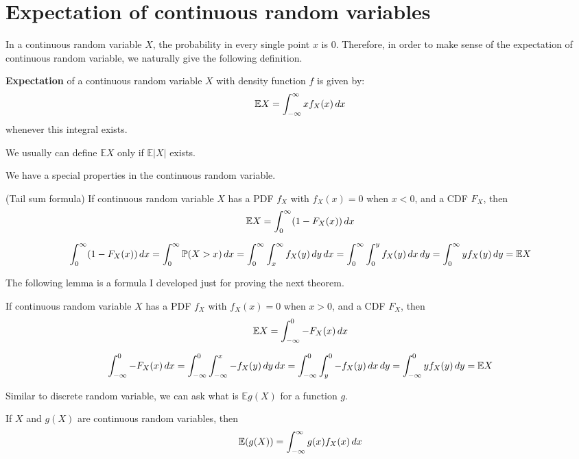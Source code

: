 \documentclass{huhtakm-template-book}
\newcommand{\prob}{\mathbb{P}}
\newcommand{\expect}{\mathbb{E}}
\begin{document}
\section{Expectation of continuous random variables}
In a continuous random variable $X$, the probability in every single point $x$ is $0$. Therefore, in order to make sense of the expectation of continuous random variable, we naturally give the following definition.
\begin{defn}
	\textbf{Expectation} of a continuous random variable $X$ with density function $f$ is given by:
	\begin{equation*}
		\expect X=\intinfty xf_{X}(x)\,dx
	\end{equation*}
	whenever this integral exists.
\end{defn}
\begin{rem}
	We usually can define $\expect X$ only if $\expect|X|$ exists.
\end{rem}
We have a special properties in the continuous random variable.
\begin{lem}(Tail sum formula)
	\label{expectation as integral of additive inverse of cdf}
	If continuous random variable $X$ has a PDF $f_{X}$ with $f_{X}(x)=0$ when $x<0$, and a CDF $F_{X}$, then
	\begin{equation*}
		\expect X=\intlu{0}{\infty}(1-F_{X}(x))\,dx
	\end{equation*}
\end{lem}
\begin{proofing}
	\begin{equation*}
		\intlu{0}{\infty}(1-F_{X}(x))\,dx=\intlu{0}{\infty}\prob(X>x)\,dx=\intlu{0}{\infty}\intlu{x}{\infty}f_{X}(y)\,dy\,dx=\intlu{0}{\infty}\intlu{0}{y}f_{X}(y)\,dx\,dy=\intlu{0}{\infty}yf_{X}(y)\,dy=\expect X
	\end{equation*}
\end{proofing}
The following lemma is a formula I developed just for proving the next theorem.
\begin{lem}
	\label{expectation as integral of cdf}
	If continuous random variable $X$ has a PDF $f_{X}$ with $f_{X}(x)=0$ when $x>0$, and a CDF $F_{X}$, then
	\begin{equation*}
		\expect X=\intlu{-\infty}{0}-F_{X}(x)\,dx
	\end{equation*}
\end{lem}
\begin{proofing}
	\begin{equation*}
		\intlu{-\infty}{0}-F_{X}(x)\,dx=\intlu{-\infty}{0}\intlu{-\infty}{x}-f_{X}(y)\,dy\,dx=\intlu{-\infty}{0}\intlu{y}{0}-f_{X}(y)\,dx\,dy=\intlu{-\infty}{0}yf_{X}(y)\,dy=\expect X
	\end{equation*}
\end{proofing}
Similar to discrete random variable, we can ask what is $\expect g(X)$ for a function $g$.
\begin{thm}
	\label{expectation of function of continuous random variable}
	If $X$ and $g(X)$ are continuous random variables, then
	\begin{equation*}
		\expect(g(X))=\intinfty g(x)f_{X}(x)\,dx
	\end{equation*}
\end{thm}
\end{document}
